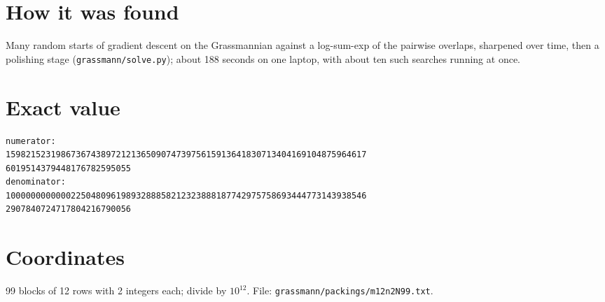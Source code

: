 \documentclass[11pt,a4paper]{article}
\begin{document}
\section{How it was found}
Many random starts of gradient descent on the Grassmannian against a log-sum-exp of the pairwise overlaps, sharpened over time, then a polishing stage (\texttt{grassmann/solve.py}); about 188 seconds on one laptop, with about ten such searches running at once.


\appendix
\section{Exact value}
{\small
\begin{verbatim}
numerator:
159821523198673674389721213650907473975615913641830713404169104875964617
6019514379448176782595055
denominator:
100000000000022504809619893288858212323888187742975758693444773143938546
2907840724717804216790056
\end{verbatim}}

\section{Coordinates}
99 blocks of 12 rows with 2 integers each; divide by $10^{12}$. File: \texttt{grassmann/packings/m12n2N99.txt}.
{\tiny
\begin{multicols}{4}
\end{multicols}}
\end{document}
